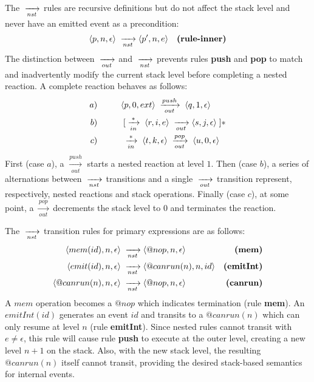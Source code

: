 The $\;\xrightarrow[nst]{\;}$ rules are recursive definitions but do not affect the stack level
and never have an emitted event as a precondition:
%
\begin{align*}
\langle p, n,\epsilon \rangle &\;\xrightarrow[nst]{\;}
\langle p',n,e        \rangle
    & \textbf{(rule-inner)}
\end{align*}
%
The distinction between $\;\xrightarrow[out]{\;}$ and $\;\xrightarrow[nst]{\;}$ prevents rules \textbf{push} and
\textbf{pop} to match and inadvertently modify the current stack level before
completing a nested reaction.
%
A complete reaction behaves as follows:
%
\begin{align*}
a) &\;\;\;\;\;\;\;\;\;\;
    \langle p,0,ext \rangle
        \;\xrightarrow[out]{push}\;
    \langle q,1,\epsilon \rangle
\\
b) &\;\;\;\;\;\;\;\;\;\; \;[ \;\xrightarrow[in]{*}\;
    \langle r,i,e \rangle
        \;\xrightarrow[out]{\;}
    \langle s,j,\epsilon \rangle \;]*
\\
c) &\;\;\;\;\;\;\;\;\;\; \;\xrightarrow[in]{*}\;
    \langle t,k,\epsilon \rangle
        \;\xrightarrow[out]{pop}\;
    \langle u,0,\epsilon \rangle
\end{align*}
%
First (case $a$), a $\xrightarrow[out]{push}$ starts a nested reaction at level
$1$.
Then (case $b$), a series of alternations between $\;\xrightarrow[nst]{\;}$ transitions and a
single $\;\xrightarrow[out]{\;}$ transition represent, respectively, nested reactions and stack
operations.
Finally (case $c$), at some point, a $\xrightarrow[out]{pop}$ decrements the
stack level to $0$ and terminates the reaction.

The $\;\xrightarrow[nst]{\;}$ transition rules for primary expressions are as follows:
%
{ \setlength{\jot}{20pt}
\begin{align*}
\langle mem(id), n, \epsilon \rangle &\;\xrightarrow[nst]{\;}
\langle @nop, n, \epsilon \rangle
    & \textbf{(mem)}        \\
\langle emit(id), n, \epsilon \rangle &\;\xrightarrow[nst]{\;}
\langle @canrun(n), n, id \rangle
    & \textbf{(emitInt)}    \\
\langle @canrun(n), n, \epsilon \rangle &\;\xrightarrow[nst]{\;}
\langle @nop, n, \epsilon \rangle
    & \textbf{(canrun)}     \\
\end{align*}
}
%
A $mem$ operation becomes a $@nop$ which indicates termination (rule
\textbf{mem}).
An $emitInt(id)$ generates an event $id$ and transits to a $@canrun(n)$ which
can only resume at level $n$ (rule \textbf{emitInt}).
Since nested rules cannot transit with $e \neq \epsilon$, this rule will cause
rule \textbf{push} to execute at the outer level, creating a new level $n+1$ on
the stack.
Also, with the new stack level, the resulting $@canrun(n)$ itself cannot
transit, providing the desired stack-based semantics for internal events.

